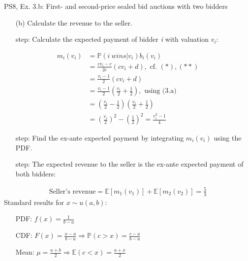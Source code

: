 \begin{frame}{PS8, Ex. 3.b: First- and second-price sealed bid auctions with two bidders}
    \begin{multicols}{2}
      \begin{itemize}
        \item[(b)] Calculate the revenue to the seller.
        \item[\nth{1} step:] Calculate the expected payment of bidder \textit{i} with valuation $v_i$:
      \end{itemize}
      \vspace{-12pt}
      \begin{align*}
        m_i(v_i)&=\mathbb{P}(i\ wins|v_i)b_i(v_i)\\
                &=\frac{cv_i-c}{2c}(cv_i+d),\text{ cf. }(*),(**)\\
                &=\frac{v_i-1}{2}(cv_i+d)\\
                &=\frac{v_i-1}{2}\left(\frac{v_i}{2}+\frac{1}{2}\right),\text{ using (3.a)}\\
                &=\left(\frac{v_i}{2}-\frac{1}{2}\right)\left(\frac{v_i}{2}+\frac{1}{2}\right)\\
                &=\left(\frac{v_i}{2}\right)^2-\left(\frac{1}{2}\right)^2
                 =\frac{v_i^2-1}{4}
      \end{align*}
      \vspace{-18pt}
      \begin{itemize}
        \item[\nth{2} step:] Find the ex-ante expected payment by integrating $m_i(v_i)$ using the PDF.
        \item[\nth{3} step:] The expected revenue to the seller is the ex-ante expected payment of both bidders:
      \end{itemize}
      \vspace{-8pt}
      \begin{align*}
        \text{Seller's revenue}=\mathbb{E}[m_1(v_1)]+\mathbb{E}[m_2(v_2)]=\frac{5}{3}
      \end{align*}
      \vfill\null\columnbreak
      Standard results for $x\sim u(a, b):$
      \vspace{-6pt}
      \begin{enumerate}
        \item[PDF:] $f(x)=\frac{1}{b-a}$
        \item[CDF:] $F(x)=\frac{x-a}{b-a}\Rightarrow\mathbb{P}(c>x)=\frac{c-a}{b-a}$
        \item[Mean:] $\mu=\frac{a+b}{2}\Rightarrow\mathbb{E}(c<x)=\frac{a+x}{2}$

\end{enumerate}
\end{multicols}
\end{frame}
